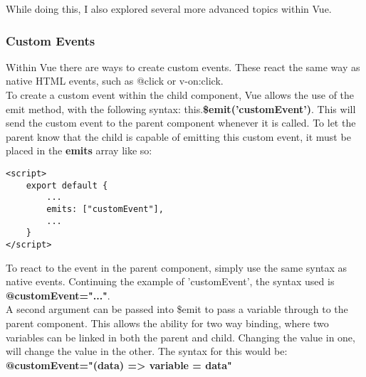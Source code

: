 \documentclass[portfolio.tex]{subfiles}
\begin{document}
				While doing this, I also explored several more advanced topics within Vue.\\

				\subsubsection{Custom Events}
					\label{custom-events}
					Within Vue there are ways to create custom events. These react the same way as native HTML events, such as @click or v-on:click.\\

					To create a custom event within the child component, Vue allows the use of the emit method, with the following syntax: this.\textbf{\$emit('customEvent')}. This will send the custom event to the parent component whenever it is called. To let the parent know that the child is capable of emitting this custom event, it must be placed in the \textbf{emits }array like so:\\

					\begin{lstlisting}
<script>
	export default {
		...
		emits: ["customEvent"],
		...
	}
</script>
					\end{lstlisting}


					To react to the event in the parent component, simply use the same syntax as native events. Continuing the example of 'customEvent', the syntax used is \textbf{@customEvent="..."}.\\

					A second argument can be passed into \$emit to pass a variable through to the parent component. This allows the ability for two way binding, where two variables can be linked in both the parent and child. Changing the value in one, will change the value in the other. The syntax for this would be:\\ \textbf{@customEvent="(data) => variable = data"}\autocite{vue-custom-event}


\end{document}
